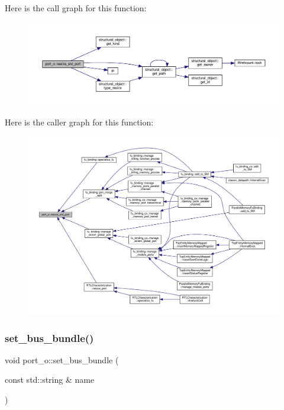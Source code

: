 Here is the call graph for this function\+:
\nopagebreak
\begin{figure}[H]
\begin{center}
\leavevmode
\includegraphics[width=350pt]{df/d75/structport__o_a43892ca0faac40059791c7a5e6235df5_cgraph}
\end{center}
\end{figure}
Here is the caller graph for this function\+:
\nopagebreak
\begin{figure}[H]
\begin{center}
\leavevmode
\includegraphics[width=350pt]{df/d75/structport__o_a43892ca0faac40059791c7a5e6235df5_icgraph}
\end{center}
\end{figure}
\mbox{\label{structport__o_ae08ac5c248b158f0b81fb65d859d4406}} 
\subsubsection{\texorpdfstring{set\+\_\+bus\+\_\+bundle()}{set\_bus\_bundle()}}
{\footnotesize\ttfamily void port\+\_\+o\+::set\+\_\+bus\+\_\+bundle (\begin{DoxyParamCaption}\item[{const std\+::string \&}]{name }\end{DoxyParamCaption})}



